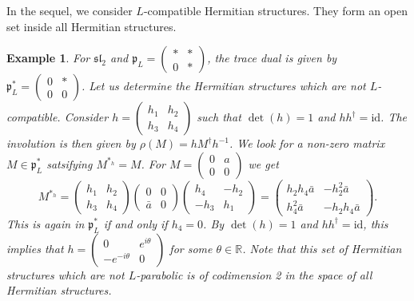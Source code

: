 \documentclass[11pt]{amsart}
\newtheorem{example}[thm]{Example}
\numberwithin{thm}{section} %
\numberwithin{equation}{section} %
\numberwithin{figure}{section} %
\newcommand*{\R}{\mathbb{R}}
\newcommand*{\h}{\mathfrak{h}}
\begin{document}
In the sequel, we consider $L$-compatible Hermitian structures. They form an open set inside all Hermitian structures.
\begin{example}
    For $\mathfrak{sl}_2$ and $\mathfrak{p}_L=\left(\begin{smallmatrix} *&*\\0&*\end{smallmatrix}\right)$, the trace dual is given by $\mathfrak{p}_L^*=\left(\begin{smallmatrix} 0&*\\0&0\end{smallmatrix}\right)$. Let us determine the Hermitian structures which are not $L$-compatible. Consider $h=\left(\begin{smallmatrix} h_1&h_2\\h_3&h_4\end{smallmatrix}\right)$ such that $\det(h)=1$ and $hh^\dagger=\mathrm{id}$. The involution is then given by $\rho(M)=hM^\dagger h^{-1}$. We look for a non-zero matrix $M\in\mathfrak{p}_L^*$ satsifying $M^{*_h}=M$. For $M=\left(\begin{smallmatrix} 0&a\\0&0\end{smallmatrix}\right)$ we get
$$M^{*_h}=\begin{pmatrix} h_1&h_2\\h_3&h_4\end{pmatrix}\begin{pmatrix} 0&0\\\bar{a}&0\end{pmatrix}\begin{pmatrix} h_4&-h_2\\-h_3&h_1\end{pmatrix}=\begin{pmatrix} h_2h_4\bar{a}&-h_2^2\bar{a}\\h_4^2\bar{a}&-h_2h_4\bar{a}\end{pmatrix}.$$
This is again in $\mathfrak{p}_L^*$ if and only if $h_4=0$. By $\det(h)=1$ and $hh^\dagger=\mathrm{id}$, this implies that $h=\left(\begin{smallmatrix} 0&e^{i\theta}\\-e^{-i\theta}&0\end{smallmatrix}\right)$ for some $\theta\in \R$. Note that this set of Hermitian structures which are not $L$-parabolic is of codimension 2 in the space of all Hermitian structures.
\end{example}
\end{document}
